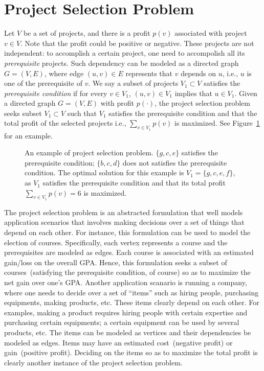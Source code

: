\setcounter{definition}{0} \setcounter{property}{0} \setcounter{claim}{0} \setcounter{fact}{0} \setcounter{corollary}{0} \setcounter{figure}{0}

\section{Project Selection Problem}

Let $V$ be a set of projects, and there is a profit $p(v)$ associated with project $v\in V$.
Note that the profit could be positive or negative.
These projects are not independent: to accomplish a certain project, one need to accompolish all its
\emph{prerequisite} projects. Such dependency can be modeled as a directed graph $G = (V, E)$,
where edge $(u,v)\in E$ represents that $v$ depends on $u$, i.e., $u$ is one of the prerequisite of $v$.
We say a subset of projects $V_1\subset V$ satisfies the \emph{prerequisite condition} if for every $v\in V_1$, 
$(u,v)\in V_1$ implies that $u\in V_1$.
Given a directed graph $G = (V, E)$ with profit $p(\cdot)$, the project
selection problem seeks subset $V_1\subset V$ such that $V_1$ satisfies the
prerequisite condition and that the total profit of the selected projects i.e.,
$\sum_{v\in V_1} p(v)$ is maximized. See Figure~\ref{fig:ps1} for an example.

\begin{figure}[!h]
\centering{}
\caption{An example of project selection problem. $\{g,c,e\}$ satisfies the
prerequisite condition; $\{b,c,d\}$ does not satisfies the prerequisite condition.
The optimal solution for this example is $V_1 = \{g,c,e,f\}$, as $V_1$ satisfies the prerequisite condition
and that its total profit $\sum_{v\in V_1} p(v) = 6$ is maximized.}
\label{fig:ps1}
\end{figure}

The project selection problem is an abstracted formulation that well models
application scenarios that involves making decisions over a set of things that depend on each other.
For instance, this formulation can be used to model the election of courses. Specifically, each vertex
represents a course and the prerequisites are modeled as edges. Each course is associated with an estimated
gain/loss on the overall GPA. Hence, this formulation seeks a subset of courses~(satisfying the prerequisite condition, of course)
so as to maximize the net gain over one's GPA. Another application scanario is
running a company, where one needs to decide over a set of ``items'' such as
hiring people, purchasing equipments, making products, etc. These items clearly depend on each other.
For examples, making a product requires hiring people with certain expertise and purchasing certain equipments;
a certain equipment can be used by several products, etc. The items can be modeled as vertices and their dependencies
be modeled as edges. Items may have an estimated cost~(negative profit) or gain~(positive profit). Deciding on the items so as to
maximize the total profit is clearly another instance of the project selection problem.

